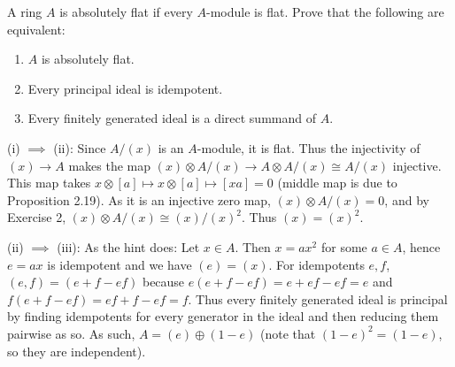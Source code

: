 \documentclass[a4paper]{exam}
\newif\ifhint
\begin{document}
\begin{questions}
	\question A ring $A $ is absolutely flat if every $A $-module is flat. Prove that the following are equivalent:
	\begin{enumerate}
		\item $A $ is absolutely flat.
		\item Every principal ideal is idempotent.
		\item Every finitely generated ideal is a direct summand of $A $.
	\end{enumerate}
	\ifhint
		Let $x\in A $. Then $A / (x) $ is a flat $A $-module, hence in the diagram
		\[
		\begin{tikzcd}
			(x) \otimes A & (x) \otimes A / (x)\ \
				A & A / (x)
		\arrow[from=1-1,to=1-2]
		\arrow["\beta",from=1-1,to=2-1]
		\arrow["\alpha",from=2-1,to=2-2]
		\arrow[from=1-2,to=2-2]
		\end{tikzcd}
		\]
		the mapping $\alpha  $ is injective. Hence $\Im(\beta ) = 0 $, hence $(x) = (x)^2 $. (ii) $\implies $ (iii): Let $x\in A $. Then $x = ax^2 $ for some $a\in A $, hence $e = ax $ is idempotent and we have $(e) = (x) $. Now if $e,f $ are idempotents, then $(e,f) = (e+f-ef) $. Hence every finitely generated ideal is principal, and generated by an idempotent $e $, hence is a direct summand because $A = (e) \oplus (e-e) $. (iii) $\implies $ (i): Use the criterion of Exercise 26.
	\fi
	\begin{solution}
		(i) $\implies $ (ii): Since $A / (x) $ is an $A $-module, it is flat.
		Thus the injectivity of $(x) \to A $ makes the map $(x) \otimes A / (x) \to A \otimes A / (x) \cong A / (x) $ injective.
		This map takes $x \otimes [a] \mapsto x \otimes [a] \mapsto [xa] = 0$ (middle map is due to Proposition 2.19).
		As it is an injective zero map, $(x) \otimes A / (x) = 0$, and by Exercise 2, $(x) \otimes A / (x) \cong (x) / (x)^2 $.
		Thus $(x) = (x)^2 $.

		(ii) $\implies $ (iii):
		As the hint does:
		Let $x\in A $.
		Then $x = ax^2 $ for some $a\in A $, hence $e = ax $ is idempotent and we have $(e) = (x) $.
		For idempotents $e,f $, $(e,f) = (e+f -ef) $ because $e(e+f-ef) = e + ef - ef = e $ and $f(e+f-ef) = ef + f - ef = f $.
		Thus every finitely generated ideal is principal by finding idempotents for every generator in the ideal and then reducing them pairwise as so.
		As such, $A = (e) \oplus (1-e) $ (note that $(1-e)^2 = (1-e) $, so they are independent).


\end{solution}
\end{questions}
\end{document}
